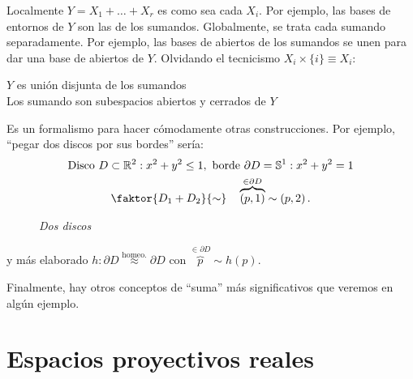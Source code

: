 \begin{pg}
Localmente $Y = X_1 + \ldots + X_r$ es como sea cada $X_i$. Por ejemplo, las bases de entornos de $Y$ son las de los sumandos. Globalmente, se trata cada sumando separadamente. Por ejemplo, las bases de abiertos de los sumandos se unen para dar una base de abiertos de $Y$. Olvidando el tecnicismo $X_i \times \{i\} \equiv X_i$:
\begin{center}
   $Y$ es unión disjunta de los sumandos\\
   Los sumando son subespacios abiertos y cerrados de $Y$
\end{center}
Es un formalismo para hacer cómodamente otras construcciones. Por ejemplo, ``pegar dos discos por sus bordes'' sería:
\begin{gather*}
    \text{Disco } D \subset \mathbb{R}^2: x^2 + y^2 \le 1, \text{ borde } \partial D = \mathbb{S}^1: x^2 + y^2 = 1\\
    \faktor{D_1 + D_2}{\sim} \quad \overbrace{\left( p, 1 \right)}^{\in \partial D} \sim \left( p, 2 \right) 
.\end{gather*}

\begin{figure}[H]
    \centering
    \caption{\textit{Dos discos}}
    \label{fig:dos-discos.}
\end{figure}
y más elaborado $h: \partial D \stackrel{\text{homeo.}}{\approx} \partial D$ con $\overbrace{p}^{\in \partial D} \sim h\left( p \right)$.

Finalmente, hay otros conceptos de ``suma'' más significativos que veremos en algún ejemplo.
\end{pg}


\section{Espacios proyectivos reales}%
\label{sec:espacios_proyectivos_reales}
